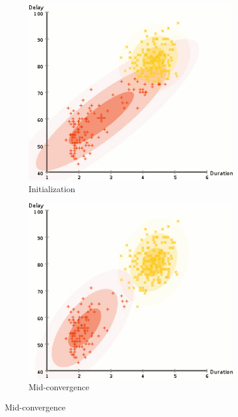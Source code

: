 \documentclass
[
    a4paper,
    twoside,
    12pt,
]
{report}
\begin{document}
\begin{figure}[]
   \centering
   \begin{subfigure}[b]{0.4\textwidth}
      \includegraphics[width=1\textwidth]{img/em-alg2.jpg}
         \caption{Initialization}
         \label{fig:gmm-init}
   \end{subfigure}
   \quad
   \begin{subfigure}[b]{0.4\textwidth}
      \includegraphics[width=1\textwidth]{img/em-alg3.jpg}
         \caption{Mid-convergence}
         \label{fig:gmm-mid}
   \end{subfigure}
   

\end{figure}
\end{document}
